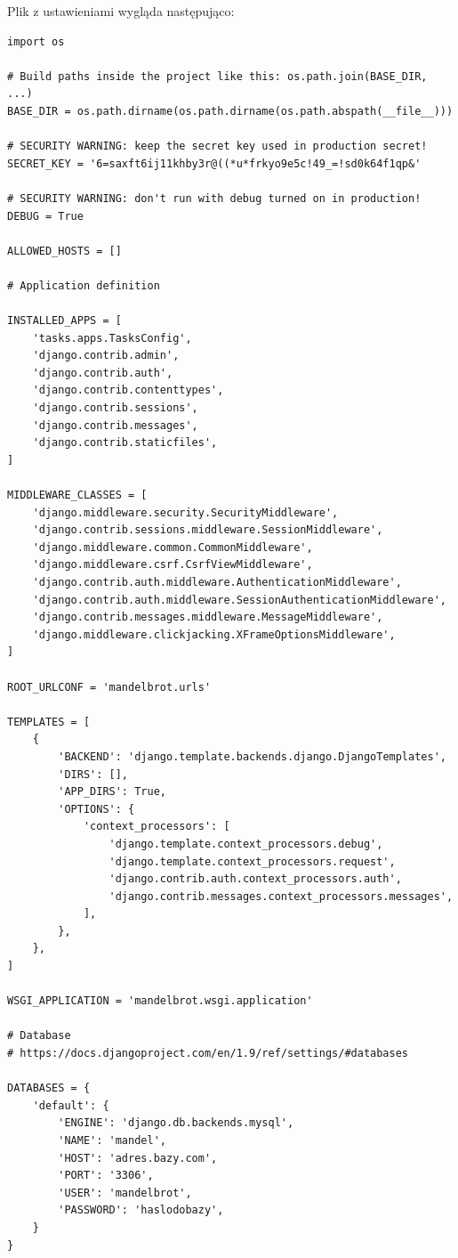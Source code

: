 \documentclass[a4paper]{article}
\begin{document}
Plik z ustawieniami wygląda następująco:
\begin{lstlisting}
import os

# Build paths inside the project like this: os.path.join(BASE_DIR, ...)
BASE_DIR = os.path.dirname(os.path.dirname(os.path.abspath(__file__)))

# SECURITY WARNING: keep the secret key used in production secret!
SECRET_KEY = '6=saxft6ij11khby3r@((*u*frkyo9e5c!49_=!sd0k64f1qp&'

# SECURITY WARNING: don't run with debug turned on in production!
DEBUG = True

ALLOWED_HOSTS = []

# Application definition

INSTALLED_APPS = [
    'tasks.apps.TasksConfig',
    'django.contrib.admin',
    'django.contrib.auth',
    'django.contrib.contenttypes',
    'django.contrib.sessions',
    'django.contrib.messages',
    'django.contrib.staticfiles',
]

MIDDLEWARE_CLASSES = [
    'django.middleware.security.SecurityMiddleware',
    'django.contrib.sessions.middleware.SessionMiddleware',
    'django.middleware.common.CommonMiddleware',
    'django.middleware.csrf.CsrfViewMiddleware',
    'django.contrib.auth.middleware.AuthenticationMiddleware',
    'django.contrib.auth.middleware.SessionAuthenticationMiddleware',
    'django.contrib.messages.middleware.MessageMiddleware',
    'django.middleware.clickjacking.XFrameOptionsMiddleware',
]

ROOT_URLCONF = 'mandelbrot.urls'

TEMPLATES = [
    {
        'BACKEND': 'django.template.backends.django.DjangoTemplates',
        'DIRS': [],
        'APP_DIRS': True,
        'OPTIONS': {
            'context_processors': [
                'django.template.context_processors.debug',
                'django.template.context_processors.request',
                'django.contrib.auth.context_processors.auth',
                'django.contrib.messages.context_processors.messages',
            ],
        },
    },
]

WSGI_APPLICATION = 'mandelbrot.wsgi.application'

# Database
# https://docs.djangoproject.com/en/1.9/ref/settings/#databases

DATABASES = {
    'default': {
        'ENGINE': 'django.db.backends.mysql',
        'NAME': 'mandel',
        'HOST': 'adres.bazy.com',
        'PORT': '3306',
        'USER': 'mandelbrot',
        'PASSWORD': 'haslodobazy',
    }
}


\end{lstlisting}
\end{document}
